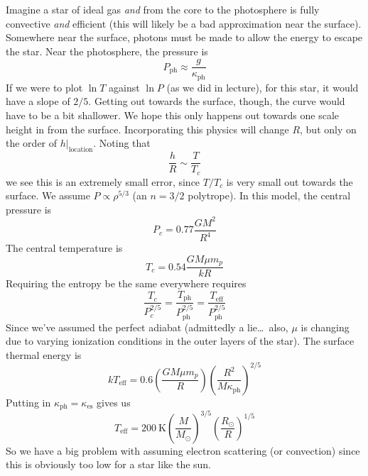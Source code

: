 \documentclass[10pt]{article}
\numberwithin{equation}{section}
\begin{document}
  Imagine a star of ideal gas \emph{and} from the core to the
  photosphere is fully convective \emph{and} efficient (this will
  likely be a bad approximation near the surface). Somewhere near the
  surface, photons must be made to allow the energy to escape the
  star. Near the photosphere, the pressure is
  \begin{equation}
    \label{eq:52}
    P_{\mathrm{ph}}\approx \frac{g}{\kappa_{\mathrm{ph}}}
  \end{equation}
  If we were to plot $\ln T$ against $\ln P$ (as we did in lecture),
  for this star, it would have a slope of $2/5$. Getting out towards
  the surface, though, the curve would have to be a bit shallower. We
  hope this only happens out towards one scale height in from the
  surface. Incorporating this physics will change $R$, but only on the
  order of $\left.h\right|_{\mathrm{location}}$. Noting that
  \begin{equation}
    \label{eq:53}
    \frac{h}{R}\sim \frac{T}{T_c}
  \end{equation}
  we see this is an extremely small error, since $T/T_c$ is very small
  out towards the surface. We assume $P\propto \rho^{5/3}$ (an $n=3/2$
  polytrope). In this model, the central pressure is
  \begin{equation}
    \label{eq:54}
    P_c=0.77\frac{GM^2}{R^4}
  \end{equation}
  The central temperature is
  \begin{equation}
    \label{eq:55}
    T_c=0.54\frac{GM\mu m_p}{kR}
  \end{equation}
  Requiring the entropy be the same everywhere requires
  \begin{equation}
    \label{eq:56}
    \frac{T_c}{P_c^{2/5}}=\frac{T_{\mathrm{ph}}}{P_{\mathrm{ph}}^{2/5}}=\frac{T_{\mathrm{eff}}}{P_{\mathrm{ph}}^{2/5}}
  \end{equation}
  Since we've assumed the perfect adiabat (admittedly a lie\ldots\
  also, $\mu$ is changing due to varying ionization conditions in the
  outer layers of the star). The surface thermal energy is
  \begin{equation}
    \label{eq:57}
    kT_{\mathrm{eff}}=0.6\left(\frac{GM\mu m_p}{R}\right)\left(\frac{R^2}{M\kappa_{\mathrm{ph}}}\right)^{2/5}
  \end{equation}
  Putting in $\kappa_{\mathrm{ph}}=\kappa_{\mathrm{es}}$ gives us 
  \begin{equation}
    \label{eq:58}
    T_{\mathrm{eff}}=200\ \mathrm{K}\left(\frac{M}{M_\odot}\right)^{3/5}\left(\frac{R_\odot}{R}\right)^{1/5}
  \end{equation}
  So we have a big problem with assuming electron scattering (or
  convection) since this is obviously too low for a star like the
  sun.\\
\end{document}
